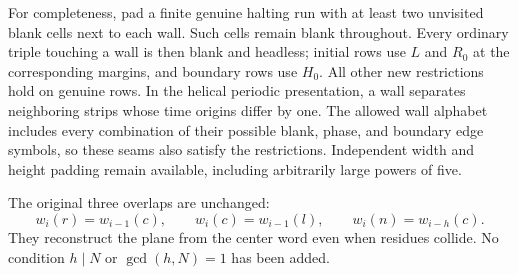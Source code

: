 \documentclass[11pt,letterpaper]{article}
\theoremstyle{remark}\newtheorem{remark}[theorem]{Remark}
\begin{document}
For completeness, pad a finite genuine halting run with at least two
unvisited blank cells next to each wall. Such cells remain blank throughout.
Every ordinary triple touching a wall is then blank and headless; initial
rows use $L$ and $R_0$ at the corresponding margins, and boundary rows use
$H_0$. All other new restrictions hold on genuine rows. In the helical
periodic presentation, a wall separates neighboring strips whose time
origins differ by one. The allowed wall alphabet includes every combination
of their possible blank, phase, and boundary edge symbols, so these seams
also satisfy the restrictions. Independent width and height padding remain
available, including arbitrarily large powers of five.

The original three overlaps are unchanged:
\[
 w_i(r)=w_{i-1}(c),\qquad w_i(c)=w_{i-1}(l),\qquad
 w_i(n)=w_{i-h}(c).
\]
They reconstruct the plane from the center word even when residues collide.
No condition $h\mid N$ or $\gcd(h,N)=1$ has been added.
\end{document}

